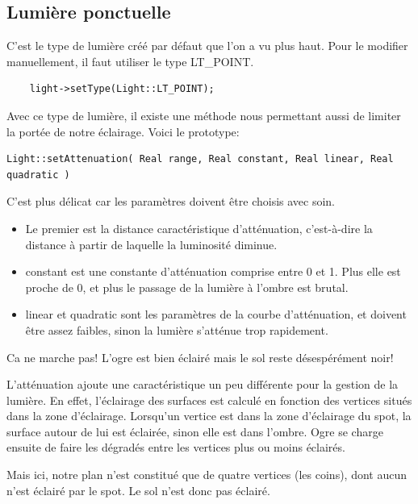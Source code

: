 \documentclass[10pt,a4paper]{report}
\begin{document}
\subsection{Lumi\`ere ponctuelle}
C'est le type de lumi\`ere cr\'e\'e par d\'efaut que l'on a vu plus haut. Pour le modifier manuellement, il faut utiliser le type LT\_POINT.

\begin{lstlisting}
	light->setType(Light::LT_POINT);
\end{lstlisting}


Avec ce type de lumi\`ere, il existe une m\'ethode nous permettant aussi de limiter la port\'ee de notre \'eclairage. Voici le prototype:
\begin{lstlisting}
Light::setAttenuation( Real range, Real constant, Real linear, Real quadratic )
\end{lstlisting}



C'est plus d\'elicat car les param\`etres doivent \^etre choisis avec soin. 
\begin{itemize}
\item Le premier est la distance caract\'eristique d'att\'enuation, c'est-\`{a}-dire la distance \`{a} partir de laquelle la luminosit\'e diminue. 
\item constant est une constante d'att\'enuation comprise entre 0 et 1. Plus elle est proche de 0, et plus le passage de la lumi\`ere \`{a} l'ombre est brutal.
\item linear et quadratic sont les param\`etres de la courbe d'att\'enuation, et doivent \^etre assez faibles, sinon la lumi\`ere s'att\'enue trop rapidement.
\end{itemize}
	


Ca ne marche pas! L'ogre est bien \'eclair\'e mais le sol reste d\'esesp\'er\'ement noir!

L'att\'enuation ajoute une caract\'eristique un peu diff\'erente pour la gestion de la lumi\`ere. En effet, l'\'eclairage des surfaces est calcul\'e en fonction des vertices situ\'es dans la zone d'\'eclairage. Lorsqu'un vertice est dans la zone d'\'eclairage du spot, la surface autour de lui est \'eclair\'ee, sinon elle est dans l'ombre. Ogre se charge ensuite de faire les d\'egrad\'es entre les vertices plus ou moins \'eclair\'es.

Mais ici, notre plan n'est constitu\'e que de quatre vertices (les coins), dont aucun n'est \'eclair\'e par le spot. Le sol n'est donc pas \'eclair\'e.
\end{document}
